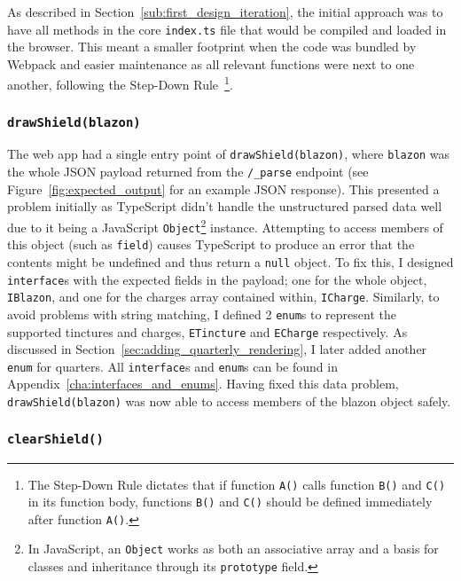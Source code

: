 \documentclass[nobib, a4paper, twoside, justified]{tufte-book}
\makeatletter
\newcommand{\charges}{\glspl{charge}\@\xspace}
\newcommand{\blazon}{\gls{blazon}\@\xspace}
\newcommand{\payload}{\gls{payload}\@\xspace}
\makeatother
\begin{document}
As described in Section~\ref{sub:first_design_iteration}, the initial approach was to have all methods in
the core \texttt{index.ts} file that would be compiled and loaded in the browser. This
meant a smaller footprint when the code was bundled by Webpack and easier maintenance as all
relevant functions were next to one another, following the Step-Down
Rule~\autocite{martin2009clean}\footnote{The Step-Down Rule dictates that if function \texttt{A()}
calls function \texttt{B()} and \texttt{C()} in its function body, functions \texttt{B()} and
\texttt{C()} should be defined immediately after function \texttt{A()}.}.

\subsubsection{\texttt{drawShield(\blazon)}}%
\label{ssub:draw_shield}

The web app had a single entry point of \texttt{drawShield(\blazon)}, where \texttt{\blazon} was
the whole JSON \payload returned from the \texttt{/\_parse} endpoint (see
Figure~\ref{fig:expected_output} for an example JSON response). This presented a problem initially
as TypeScript didn't handle the unstructured parsed data well due to it being a JavaScript
\texttt{Object}\footnote{In JavaScript, an \texttt{Object} works as both an associative array and a
basis for classes and inheritance through its \texttt{prototype} field.} instance. Attempting to
access members of this object (such as \texttt{\gls{field}}) causes TypeScript to produce an error
that the contents might be undefined and thus return a \texttt{null} object. To fix this, I
designed \texttt{interface}s with the expected fields in the \payload; one for the whole object,
\texttt{IBlazon}, and one for the \charges array contained within, \texttt{ICharge}. Similarly, to
avoid problems with string matching, I defined 2 \texttt{enum}s to represent the supported
tinctures and \charges, \texttt{ETincture} and \texttt{ECharge} respectively. As discussed in
Section~\ref{sec:adding_quarterly_rendering}, I later added another \texttt{enum} for quarters.
All \texttt{interface}s and \texttt{enum}s can be found in Appendix~\ref{cha:interfaces_and_enums}.
Having fixed this data problem, \texttt{drawShield(\blazon)} was now able to access members of the
\blazon object safely.

\subsubsection{\texttt{clearShield()}}%
\label{ssub:clear_shield}
\end{document}
